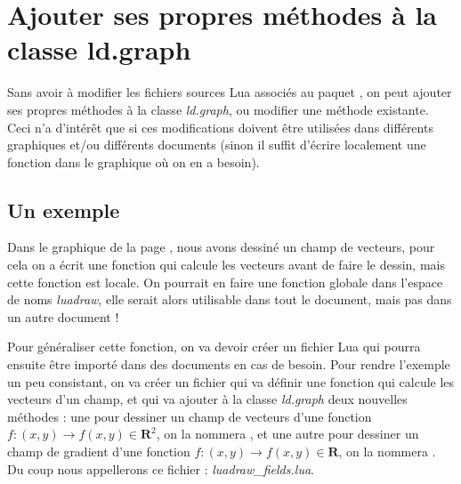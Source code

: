 \section{Ajouter ses propres méthodes à la classe ld.graph}

Sans avoir à modifier les fichiers sources Lua associés au paquet \luadrawenv, on peut ajouter ses propres méthodes à la classe \emph{ld.graph}, ou modifier une méthode existante. Ceci n'a d'intérêt que si ces modifications doivent être utilisées dans différents graphiques et/ou différents documents (sinon il suffit d'écrire localement une fonction dans le graphique où on en a besoin).

\subsection{Un exemple}
Dans le graphique de la page \pageref{champ}, nous avons dessiné un champ de vecteurs, pour cela on a écrit une fonction qui calcule les vecteurs avant de faire le dessin, mais cette fonction est locale. On pourrait en faire une fonction globale dans l'espace de noms \emph{luadraw}, elle serait alors utilisable dans tout le document, mais pas dans un autre document !

Pour généraliser cette fonction, on va devoir créer un fichier Lua qui pourra ensuite être importé dans des documents en cas de besoin. Pour rendre l'exemple un peu consistant, on va créer un fichier qui va définir une fonction qui calcule les vecteurs d'un champ, et qui va ajouter à la classe \emph{ld.graph} deux nouvelles méthodes : une pour dessiner un champ de vecteurs d'une fonction $f\colon(x,y)\to f(x,y)\in \mathbf R^2$, on la nommera , et une autre pour dessiner un champ de gradient d'une fonction $f\colon(x,y)\to f(x,y) \in \mathbf R$, on la nommera . Du coup nous appellerons ce fichier : \emph{luadraw\_fields.lua}.

